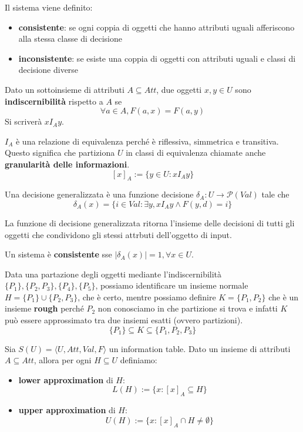 Il sistema viene definito:
\begin{itemize}
    \item \textbf{consistente}: se ogni coppia di oggetti che hanno attributi uguali 
    afferiscono alla stessa classe di decisione
    \item \textbf{inconsistente}: se esiste una  coppia di oggetti
    con attributi uguali e classi di decisione diverse
\end{itemize}

\begin{definizione} 
    Dato un sottoinsieme di attributi $A\subseteq Att$, due oggetti $x,y\in U$ sono 
    \textbf{indiscernibilità} rispetto a $A$ se 
    $$\forall a \in A, F(a, x) = F(a,y)$$
    Si scriverà $xI_A y$.
\end{definizione}
$I_A$ è una relazione di equivalenza perché è riflessiva, simmetrica e transitiva.
Questo significa che partiziona $U$ in classi di equivalenza chiamate anche \textbf{granularità 
delle informazioni}.
$$[x]_A:=\{y\in U:xI_Ay\}$$

\begin{definizione}
    Una decisione generalizzata è una funzione decisione $\delta_A: U \to \mathcal{P}(Val)$
    tale che 
    $$\delta_A(x) = \{i \in Val: \exists y, xI_A y \land F(y,d) = i \}$$
\end{definizione}

La funzione di decisione generalizzata ritorna l'insieme delle decisioni di tutti 
gli oggetti che condividono gli stessi attrbuti dell'oggetto di input.

\begin{nota}
    Un sistema è \textbf{consistente} sse $|\delta_A(x)| = 1,\forall x\in U$.
\end{nota}

Data una partazione degli oggetti mediante l'indiscernibilità $\{P_1\}, \{P_2,P_3\}, 
\{P_4\}, \{P_5\}$, possiamo identificare un insieme normale $H = \{P_1\}\cup\{P_2,P_3\}$, 
che è certo, mentre possiamo definire $K=\{P_1,P_2\}$  che è un insieme \textbf{rough}
perché $P_2$ non conosciamo in che partizione si trova e infatti $K$ può essere approssimato 
tra due insiemi esatti (ovvero partizioni).
$$\{P_1\} \subseteq K \subseteq \{P_1,P_2,P_3\}$$


\begin{definizione}
    Sia $S(U) = \langle U, Att, Val, F\rangle$ un information table. Dato un insieme 
    di attributi $A\subseteq Att$, allora per ogni $H\subseteq U$ definiamo:
    \begin{itemize}
        \item \textbf{lower approximation} di $H$:
        $$L(H):= \{x: [x]_A\subseteq H\}$$
        \item \textbf{upper approximation} di $H$:
        $$U(H):= \{x: [x]_A \cap H\ne \emptyset\}$$
    \end{itemize}
\end{definizione}

